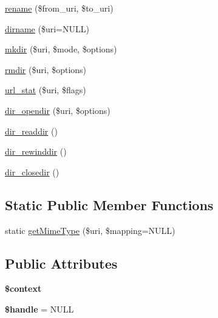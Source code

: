 \begin{DoxyCompactItemize}
\item 
\hyperlink{classDrupalLocalStreamWrapper_a0c414246b7b28f5df273ecf33ec9914a}{rename} (\$from\_\-uri, \$to\_\-uri)
\item 
\hyperlink{classDrupalLocalStreamWrapper_ab98ad39ce1745a24c760abf3e4297577}{dirname} (\$uri=NULL)
\item 
\hyperlink{classDrupalLocalStreamWrapper_a4335af3c075b49182060012ce2b4f735}{mkdir} (\$uri, \$mode, \$options)
\item 
\hyperlink{classDrupalLocalStreamWrapper_aa9b940cbd7a7dc93d2060457da6b293d}{rmdir} (\$uri, \$options)
\item 
\hyperlink{classDrupalLocalStreamWrapper_ac41bed06ba3f0959a9ef03130cf0f8fd}{url\_\-stat} (\$uri, \$flags)
\item 
\hyperlink{classDrupalLocalStreamWrapper_a5b80a0510f46a5da5ae6b3a9ecd01f6e}{dir\_\-opendir} (\$uri, \$options)
\item 
\hyperlink{classDrupalLocalStreamWrapper_a9f36b143a44f64e25962b67a9c16fb8c}{dir\_\-readdir} ()
\item 
\hyperlink{classDrupalLocalStreamWrapper_a0136ec99b77e9443c1013f0162cb45bb}{dir\_\-rewinddir} ()
\item 
\hyperlink{classDrupalLocalStreamWrapper_a6543951f671cd1a785f46b51be315423}{dir\_\-closedir} ()
\end{DoxyCompactItemize}
\subsection*{Static Public Member Functions}
\begin{DoxyCompactItemize}
\item 
static \hyperlink{classDrupalLocalStreamWrapper_ae6baa873a904204192636830d2bacaac}{getMimeType} (\$uri, \$mapping=NULL)
\end{DoxyCompactItemize}
\subsection*{Public Attributes}
\begin{DoxyCompactItemize}
\item 
\hypertarget{classDrupalLocalStreamWrapper_a2b06049f91bdd27b51ba1f7ab333bc46}{
{\bfseries \$context}}
\label{classDrupalLocalStreamWrapper_a2b06049f91bdd27b51ba1f7ab333bc46}

\item 
\hypertarget{classDrupalLocalStreamWrapper_a78b91266f7afb77705fb19c9ba43ae5a}{
{\bfseries \$handle} = NULL}
\label{classDrupalLocalStreamWrapper_a78b91266f7afb77705fb19c9ba43ae5a}

\end{DoxyCompactItemize}
